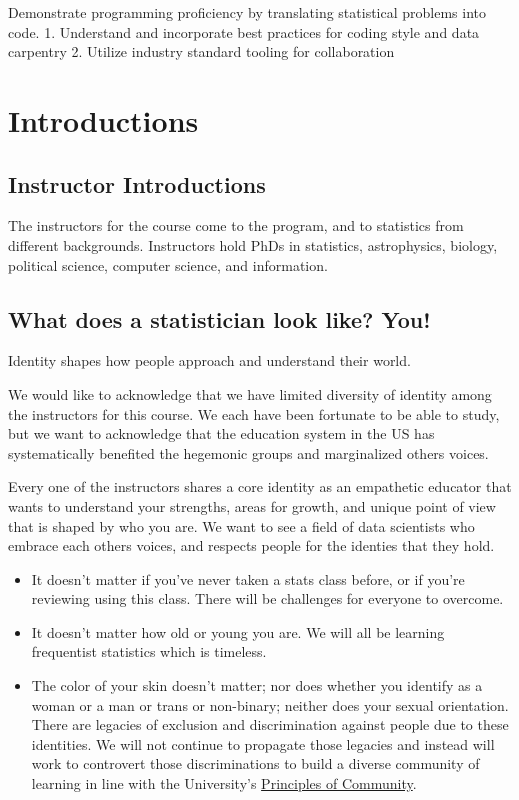 \documentclass[
]{book}
\providecommand{\tightlist}{%
  \setlength{\itemsep}{0pt}\setlength{\parskip}{0pt}}
\theoremstyle{definition}
\theoremstyle{definition}
\theoremstyle{definition}
\theoremstyle{definition}
\theoremstyle{remark}
\begin{document}
Demonstrate programming proficiency by translating statistical problems into code.
1. Understand and incorporate best practices for coding style and data carpentry
2. Utilize industry standard tooling for collaboration

\hypertarget{introductions}{%
\section{Introductions}\label{introductions}}

\hypertarget{instructor-introductions}{%
\subsection{Instructor Introductions}\label{instructor-introductions}}

The instructors for the course come to the program, and to statistics from different backgrounds. Instructors hold PhDs in statistics, astrophysics, biology, political science, computer science, and information.

\hypertarget{what-does-a-statistician-look-like-you}{%
\subsection{What does a statistician look like? You!}\label{what-does-a-statistician-look-like-you}}

Identity shapes how people approach and understand their world.

We would like to acknowledge that we have limited diversity of identity among the instructors for this course. We each have been fortunate to be able to study, but we want to acknowledge that the education system in the US has systematically benefited the hegemonic groups and marginalized others voices.

Every one of the instructors shares a core identity as an empathetic educator that wants to understand your strengths, areas for growth, and unique point of view that is shaped by who you are. We want to see a field of data scientists who embrace each others voices, and respects people for the identies that they hold.

\begin{itemize}
\tightlist
\item
  It doesn't matter if you've never taken a stats class before, or if you're reviewing using this class. There will be challenges for everyone to overcome.
\item
  It doesn't matter how old or young you are. We will all be learning frequentist statistics which is timeless.
\item
  The color of your skin doesn't matter; nor does whether you identify as a woman or a man or trans or non-binary; neither does your sexual orientation. There are legacies of exclusion and discrimination against people due to these identities. We will not continue to propagate those legacies and instead will work to controvert those discriminations to build a diverse community of learning in line with the University's \href{https://diversity.berkeley.edu/principles-community}{Principles of Community}.
\end{itemize}
\end{document}
